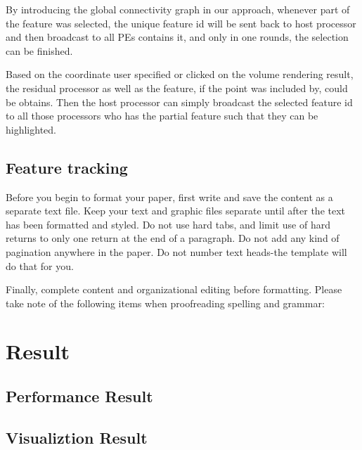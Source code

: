 \documentclass[10pt, conference, compsocconf]{IEEEtran}
\begin{document}
By introducing the global connectivity graph in our approach, whenever part of the feature was selected, the unique feature id will be sent back to host processor and then broadcast to all PEs contains it, and only in one rounds, the selection can be finished.

Based on the coordinate user specified or clicked on the volume rendering result, the residual processor as well as the feature, if the point was included by, could be obtains. Then the host processor can simply broadcast the selected feature id to all those processors who has the partial feature such that they can be highlighted.


\subsection{Feature tracking}
Before you begin to format your paper, first write and save the content as a separate text file. Keep your text and graphic files separate until after the text has been formatted and styled. Do not use hard tabs, and limit use of hard returns to only one return at the end of a paragraph. Do not add any kind of pagination anywhere in the paper. Do not number text heads-the template will do that for you.

Finally, complete content and organizational editing before formatting. Please take note of the following items when proofreading spelling and grammar:

\section{Result}
\subsection{Performance Result}
\subsection{Visualiztion Result}
\end{document}

